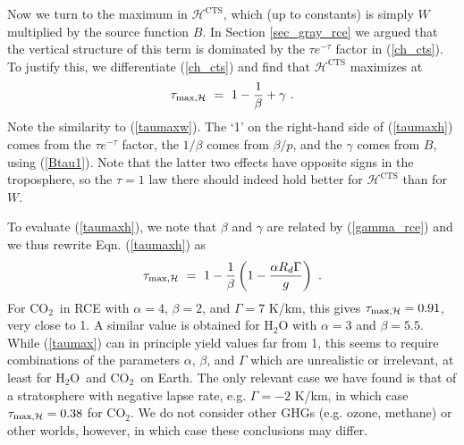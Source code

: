 \documentclass{ametsoc}
\newcommand{\beqn}{\begin{equation}}
\newcommand{\eeqn}{\end{equation}}
\newcommand{\eqnref}[1]{(\ref{#1})}
\newcommand{\Rd}{\ensuremath{R_d}}
\newcommand{\cotwo}{\ensuremath{\mathrm{CO_2}}}
\newcommand{\htwo}{\ensuremath{\mathrm{H_2O}}}
\newcommand{\ch}{\ensuremath{\mathcal{H}}}
\newcommand{\taumaxh}{\ensuremath{\tau_{\text{max,\ch}}}}
\newcommand{\CTS}{\ensuremath{\mathrm{CTS}}}
\begin{document}
Now we turn to the maximum in $\ch^{\CTS}$, which (up to constants) is simply $W$ multiplied by the source function $B$. In Section \ref{sec_gray_rce} we argued that the vertical structure of this term is dominated by the $\tau e^{-\tau}$ factor in \eqnref{ch_cts}. To justify this, we  differentiate \eqnref{ch_cts} and find that $\ch^{\CTS}$ maximizes at 
\beqn
	\taumaxh \ = \ 1 - \frac{1}{\beta}  + \gamma \ .
	\label{taumaxh}
\eeqn
Note the similarity to \eqnref{taumaxw}. The `1' on the right-hand side of \eqnref{taumaxh} comes from the $\tau e^{-\tau}$ factor, the $1/\beta$ comes from $\beta/p$, and the $\gamma$ comes from $B$, using \eqnref{Btau1}. Note that the latter two effects have opposite signs in the troposphere, so the $\tau=1$ law there should indeed hold better for $\ch^{\CTS}$ than for $W$. 

To evaluate \eqnref{taumaxh}, we note that $\beta$ and $\gamma$ are related by \eqnref{gamma_rce} and we thus rewrite Eqn. \eqnref{taumaxh} as
\beqn
	\taumaxh \ = \ 1 - \frac{1}{\beta}\left(1-\frac{\alpha\Rd\Gamma}{g}\right) \ .
	\label{taumax}
\eeqn
 For \cotwo\ in RCE with $\alpha=4$, $\beta=2$, and $\Gamma=7$ K/km, this gives $\taumaxh = 0.91$, very close to 1. A similar value is obtained for $\htwo$ with $\alpha=3$ and $\beta=5.5$.  While \eqnref{taumax} can in principle yield values far from 1, this seems to require combinations of the parameters $\alpha$, $\beta$, and $\Gamma$ which are unrealistic or irrelevant, at least for \htwo\ and \cotwo\ on Earth. The only relevant case we have found is that of a stratosphere with negative lapse rate, e.g. $\Gamma=-2$ K/km, in which case $\taumaxh=0.38$ for \cotwo. We do not consider other GHGs (e.g. ozone, methane) or other worlds, however, in which case these conclusions  may differ. 
 


\end{document}
